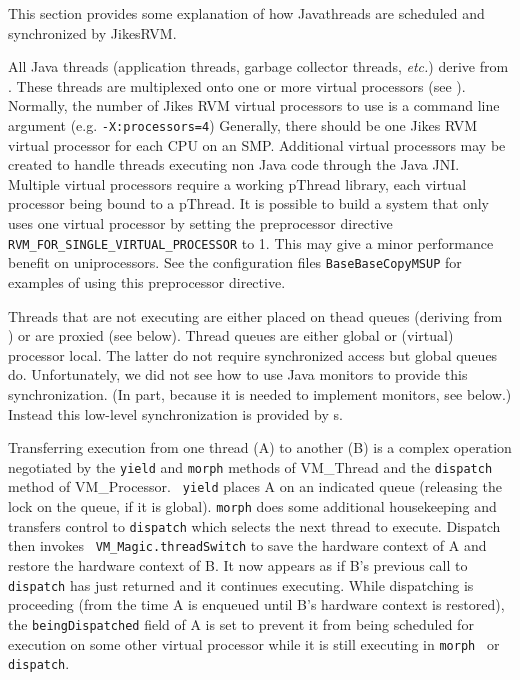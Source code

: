 This section provides some explanation of how Java\trademark threads are
scheduled and synchronized by Jikes\trademark RVM.


All Java threads (application threads, garbage collector threads, {\em
etc.})  derive from 
.  
These threads are multiplexed onto
one or more virtual processors (see 
).  Normally, the
number of Jikes RVM virtual processors to use is a command line argument
(e.g. {\tt -X:processors=4}) Generally, there should be one Jikes RVM
virtual processor for each CPU on an SMP.  Additional virtual
processors may be created to handle threads executing non Java code
through the Java JNI.  Multiple virtual processors require a working
pThread library, each virtual processor being bound to a pThread.  It
is possible to build a system that only uses one virtual processor by
setting the preprocessor directive {\tt
RVM\_FOR\_SINGLE\_VIRTUAL\_PROCESSOR} to 1.  This may give a minor
performance benefit on uniprocessors. See the configuration files
{\tt BaseBaseCopyMSUP} for examples of
using this preprocessor directive.

Threads that are not executing are either placed on thead queues
(deriving from 
) or are proxied (see below).
Thread queues are either global or (virtual) processor local.  The
latter do not require synchronized access but global queues do.
Unfortunately, we did not see how to use Java monitors to provide
this synchronization.  (In part, because it is needed to implement
monitors, see below.)  Instead this low-level synchronization is
provided by 
s.

Transferring execution from one thread (A) to another (B) is a complex
operation negotiated by the {\tt yield} and {\tt morph} methods of
VM\_Thread and the {\tt dispatch} method of VM\_Processor.  {\tt
yield} places A on an indicated queue (releasing the lock on the
queue, if it is global).  {\tt morph} does some additional
housekeeping and transfers control to {\tt dispatch} which selects the
next thread to execute. Dispatch then invokes {\tt
VM\_Magic.threadSwitch} to save the hardware context of A and restore
the hardware context of B.  It now appears as if B's previous call to
{\tt dispatch} has just returned and it continues executing. While
dispatching is proceeding (from the time A is enqueued until B's
hardware context is restored), the {\tt beingDispatched} field of A is
set to prevent it from being scheduled for execution on some other
virtual processor while it is still executing in {\tt morph } or {\tt
dispatch}. 

